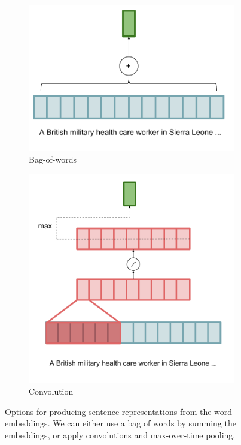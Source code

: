 \documentclass[12pt]{report}
\begin{document}
\begin{figure}[t]
\centering
\begin{subfigure}{0.45\textwidth}
	\includegraphics[width=\textwidth]{images/bow_encoder_bow}
	\caption{Bag-of-words}
	\label{fig:bow_encoder_bow}
\end{subfigure}
\begin{subfigure}{0.45\textwidth}
	\includegraphics[width=\textwidth]{images/bow_encoder_conv}
	\caption{Convolution}
	\label{fig:bow_encoder_conv}
\end{subfigure}
\caption{Options for producing sentence representations from the word embeddings. We can either use a bag of words by summing the embeddings, or apply convolutions and max-over-time pooling. }
\label{fig:sent_reps}
\end{figure}
\end{document}
